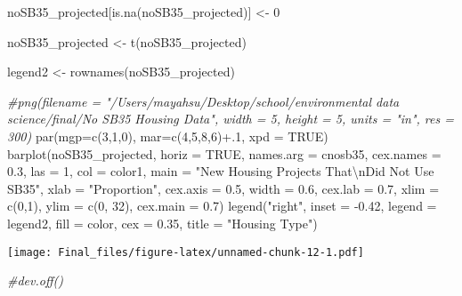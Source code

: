 \documentclass[
]{article}
\newenvironment{Shaded}{\begin{snugshade}}{\end{snugshade}}
\newcommand{\AttributeTok}[1]{\textcolor[rgb]{0.77,0.63,0.00}{#1}}
\newcommand{\CommentTok}[1]{\textcolor[rgb]{0.56,0.35,0.01}{\textit{#1}}}
\newcommand{\ConstantTok}[1]{\textcolor[rgb]{0.00,0.00,0.00}{#1}}
\newcommand{\DecValTok}[1]{\textcolor[rgb]{0.00,0.00,0.81}{#1}}
\newcommand{\FloatTok}[1]{\textcolor[rgb]{0.00,0.00,0.81}{#1}}
\newcommand{\FunctionTok}[1]{\textcolor[rgb]{0.00,0.00,0.00}{#1}}
\newcommand{\NormalTok}[1]{#1}
\newcommand{\OtherTok}[1]{\textcolor[rgb]{0.56,0.35,0.01}{#1}}
\newcommand{\SpecialCharTok}[1]{\textcolor[rgb]{0.00,0.00,0.00}{#1}}
\newcommand{\StringTok}[1]{\textcolor[rgb]{0.31,0.60,0.02}{#1}}
\begin{document}
\begin{Shaded}
\begin{Highlighting}[]
\NormalTok{noSB35\_projected[}\FunctionTok{is.na}\NormalTok{(noSB35\_projected)] }\OtherTok{\textless{}{-}} \DecValTok{0}

\NormalTok{noSB35\_projected }\OtherTok{\textless{}{-}} \FunctionTok{t}\NormalTok{(noSB35\_projected)}

\NormalTok{legend2 }\OtherTok{\textless{}{-}} \FunctionTok{rownames}\NormalTok{(noSB35\_projected)}

\CommentTok{\#png(filename = "/Users/mayahsu/Desktop/school/environmental data science/final/No SB35 Housing Data", width = 5, height = 5, units = "in", res = 300)}
\FunctionTok{par}\NormalTok{(}\AttributeTok{mgp=}\FunctionTok{c}\NormalTok{(}\DecValTok{3}\NormalTok{,}\DecValTok{1}\NormalTok{,}\DecValTok{0}\NormalTok{), }\AttributeTok{mar=}\FunctionTok{c}\NormalTok{(}\DecValTok{4}\NormalTok{,}\DecValTok{5}\NormalTok{,}\DecValTok{8}\NormalTok{,}\DecValTok{6}\NormalTok{)}\SpecialCharTok{+}\NormalTok{.}\DecValTok{1}\NormalTok{, }\AttributeTok{xpd =} \ConstantTok{TRUE}\NormalTok{)}
\FunctionTok{barplot}\NormalTok{(noSB35\_projected, }\AttributeTok{horiz =} \ConstantTok{TRUE}\NormalTok{, }\AttributeTok{names.arg =}\NormalTok{ cnosb35, }\AttributeTok{cex.names =} \FloatTok{0.3}\NormalTok{, }\AttributeTok{las =} \DecValTok{1}\NormalTok{, }\AttributeTok{col =}\NormalTok{ color1, }\AttributeTok{main =} \StringTok{"New Housing Projects That}\SpecialCharTok{\textbackslash{}n}\StringTok{Did Not Use SB35"}\NormalTok{, }\AttributeTok{xlab =} \StringTok{"Proportion"}\NormalTok{, }\AttributeTok{cex.axis =} \FloatTok{0.5}\NormalTok{, }\AttributeTok{width =} \FloatTok{0.6}\NormalTok{, }\AttributeTok{cex.lab =} \FloatTok{0.7}\NormalTok{, }\AttributeTok{xlim =} \FunctionTok{c}\NormalTok{(}\DecValTok{0}\NormalTok{,}\DecValTok{1}\NormalTok{), }\AttributeTok{ylim =} \FunctionTok{c}\NormalTok{(}\DecValTok{0}\NormalTok{, }\DecValTok{32}\NormalTok{), }\AttributeTok{cex.main =} \FloatTok{0.7}\NormalTok{)}
\FunctionTok{legend}\NormalTok{(}\StringTok{"right"}\NormalTok{, }\AttributeTok{inset =} \SpecialCharTok{{-}}\FloatTok{0.42}\NormalTok{, }\AttributeTok{legend =}\NormalTok{ legend2, }\AttributeTok{fill =}\NormalTok{ color, }\AttributeTok{cex =} \FloatTok{0.35}\NormalTok{, }\AttributeTok{title =} \StringTok{"Housing Type"}\NormalTok{)}
\end{Highlighting}
\end{Shaded}

\texttt{[image: Final\_files/figure-latex/unnamed-chunk-12-1.pdf]}

\begin{Shaded}
\begin{Highlighting}[]
\CommentTok{\#dev.off()}
\end{Highlighting}
\end{Shaded}
\end{document}

